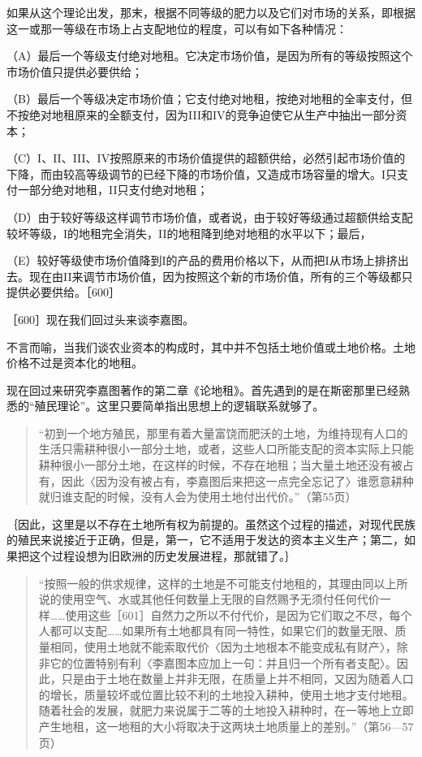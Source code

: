 如果从这个理论出发，那末，根据不同等级的肥力以及它们对市场的关系，即根据这一或那一等级在市场上占支配地位的程度，可以有如下各种情况：

（A）最后一个等级支付绝对地租。它决定市场价值，是因为所有的等级按照这个市场价值只提供必要供给；

（B）最后一个等级决定市场价值；它支付绝对地租，按绝对地租的全率支付，但不按绝对地租原来的全额支付，因为III和IV的竞争迫使它从生产中抽出一部分资本；

（C）I、II、III、IV按照原来的市场价值提供的超额供给，必然引起市场价值的下降，而由较高等级调节的已经下降的市场价值，又造成市场容量的增大。I只支付一部分绝对地租，II只支付绝对地租；

（D）由于较好等级这样调节市场价值，或者说，由于较好等级通过超额供给支配较坏等级，I的地租完全消失，II的地租降到绝对地租的水平以下；最后，

（E）较好等级使市场价值降到I的产品的费用价格以下，从而把I从市场上排挤出去。现在由II来调节市场价值，因为按照这个新的市场价值，所有的三个等级都只提供必要供给。［600］

［600］现在我们回过头来谈李嘉图。


不言而喻，当我们谈农业资本的构成时，其中并不包括土地价值或土地价格。土地价格不过是资本化的地租。



现在回过来研究李嘉图著作的第二章《论地租》。首先遇到的是在斯密那里已经熟悉的“殖民理论”。这里只要简单指出思想上的逻辑联系就够了。

\begin{quote}{“初到一个地方殖民，那里有着大量富饶而肥沃的土地，为维持现有人口的生活只需耕种很小一部分土地，或者，这些人口所能支配的资本实际上只能耕种很小一部分土地，在这样的时候，不存在地租；当大量土地还没有被占有，因此〈因为没有被占有，李嘉图后来把这一点完全忘记了〉谁愿意耕种就归谁支配的时候，没有人会为使用土地付出代价。”（第55页）}\end{quote}

｛因此，这里是以不存在土地所有权为前提的。虽然这个过程的描述，对现代民族的殖民来说接近于正确，但是，第一，它不适用于发达的资本主义生产；第二，如果把这个过程设想为旧欧洲的历史发展进程，那就错了。｝

\begin{quote}{“按照一般的供求规律，这样的土地是不可能支付地租的，其理由同以上所说的使用空气、水或其他任何数量上无限的自然赐予无须付任何代价一样……使用这些［601］自然力之所以不付代价，是因为它们取之不尽，每个人都可以支配……如果所有土地都具有同一特性，如果它们的数量无限、质量相同，使用土地就不能索取代价〈因为土地根本不能变成私有财产〉，除非它的位置特别有利〈李嘉图本应加上一句：并且归一个所有者支配〉。因此，只是由于土地在数量上并非无限，在质量上并不相同，又因为随着人口的增长，质量较坏或位置比较不利的土地投入耕种，使用土地才支付地租。随着社会的发展，就肥力来说属于二等的土地投入耕种时，在一等地上立即产生地租，这一地租的大小将取决于这两块土地质量上的差别。”（第56—57页）}\end{quote}


